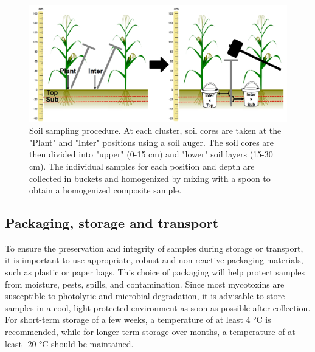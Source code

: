 \begin{refsection}
\begin{figure}[h]
\centering
\includegraphics[width=1\textwidth]{figures/sop_soil sampling 2.jpg}
\decoRule
\captionsetup{labelfont=bf, justification=justified, singlelinecheck=false, width=1\textwidth}
\caption{Soil sampling procedure. At each cluster, soil cores are taken at the "Plant" and "Inter" positions using a soil auger. The soil cores are then divided into "upper" (0-15 cm) and "lower" soil layers (15-30 cm). The individual samples for each position and depth are collected in buckets and homogenized by mixing with a spoon to obtain a homogenized composite sample.}
\label{fig:SOP2}
\end{figure}

\subsection*{Packaging, storage and transport}

To ensure the preservation and integrity of samples during storage or transport, it is important to use appropriate, robust and non-reactive packaging materials, such as plastic or paper bags. This choice of packaging will help protect samples from moisture, pests, spills, and contamination. Since most mycotoxins are susceptible to photolytic and microbial degradation, it is advisable to store samples in a cool, light-protected environment as soon as possible after collection. For short-term storage of a few weeks, a temperature of at least 4 °C is recommended, while for longer-term storage over months, a temperature of at least -20 °C should be maintained.


\end{refsection}
